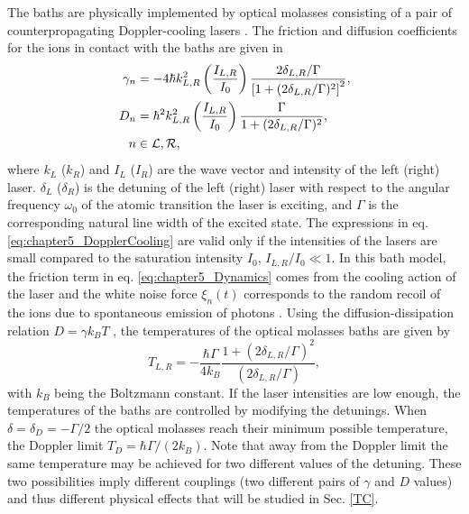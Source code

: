 The baths are physically implemented by optical molasses consisting of a pair of counterpropagating Doppler-cooling lasers \cite{Ruiz2014}. The friction and diffusion coefficients for the ions in contact with the baths are given in \cite{Cohen1992,Metcalf2003,Ruiz2014}
%
\begin{equation}
    \begin{split}
        \gamma_n &= -4 \hbar k_{L,R}^2 \left(\frac{I_{L,R}}{I_0}\right)\frac{2\delta_{L,R}/\Gamma}{\left[1 + (2\delta_{L,R}/\Gamma)^2\right]^2},\\
        D_n &= \hbar^2 k_{L,R}^2 \left(\frac{I_{L,R}}{I_0}\right) \frac{\Gamma}{1 + (2\delta_{L,R}/\Gamma)^2},\\
        n &\in \cal{L},\cal{R},
    \end{split}
    \label{eq:chapter5_DopplerCooling}
\end{equation}
%
where $k_L$ ($k_R$) and $I_L$ ($I_R$) are the wave vector and intensity of the left (right) laser. $\delta_L$ ($\delta_R$) is the detuning of the left (right) laser with respect to the angular frequency $\omega_0$ of the atomic transition the laser is exciting, and $\Gamma$ is the corresponding natural line width of the  excited state. The expressions in eq. \eqref{eq:chapter5_DopplerCooling} are valid only if the intensities of the lasers are small compared to the saturation intensity $I_0$, $I_{L,R}/I_0\ll 1$. In this bath model, the friction term in eq. \eqref{eq:chapter5_Dynamics} comes from the cooling action of the laser and the white noise force $\xi_n(t)$ corresponds to the random recoil of the ions due to spontaneous emission of photons \cite{Metcalf2003,Cohen1992}. Using the diffusion-dissipation relation $D = \gamma k_B T $ \cite{Chee2010}, the temperatures of the optical molasses baths are given by
%
\begin{equation}
    T_{L,R} = -\frac{\hbar \Gamma}{4 k_B} \frac{1+(2\delta_{L,R}/\Gamma)^2}{(2\delta_{L,R}/\Gamma)},
    \label{eq:chapter5_Doppler}
\end{equation}
%
with $k_B$ being the Boltzmann constant. If the laser intensities are low enough, the temperatures of the baths are controlled by modifying the detunings. When $\delta = \delta_D=-\Gamma / 2$ the optical molasses reach their minimum possible temperature, the Doppler limit $T_{D} = {\hbar \Gamma}/({2k_B})$. Note that away from the Doppler limit the same temperature may be achieved
for two different values of the detuning. These two possibilities imply different couplings (two different pairs of $\gamma$ and $D$ values) and thus different physical effects that will be studied in Sec. \ref{TC}.
%
%
%
%
